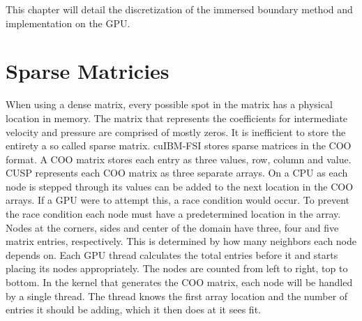 This chapter will detail the discretization of the immersed boundary method and implementation on the GPU. 

\section{Sparse Matricies}
When using a dense matrix, every possible spot in the matrix has a physical location in memory. 
The matrix that represents the coefficients for intermediate velocity and pressure are comprised of mostly zeros. 
It is inefficient to store the entirety a so called sparse matrix. 
cuIBM-FSI stores sparse matrices in the COO format. 
A COO matrix stores each entry as three values, row, column and value. 
CUSP represents each COO matrix as three separate arrays. 
On a CPU as each node is stepped through its values can be added to the next location in the COO arrays. 
If a GPU were to attempt this, a race condition would occur. 
To prevent the race condition each node must have a predetermined location in the array. 
Nodes at the corners, sides and center of the domain have three, four and five matrix entries, respectively. 
This is determined by how many neighbors each node depends on. 
Each GPU thread calculates the total entries before it and starts placing its nodes appropriately. 
The nodes are counted from left to right, top to bottom. 
In the kernel that generates the COO matrix, each node will be handled by a single thread. 
The thread knows the first array location and the number of entries it should be adding, which it then does at it sees fit.

